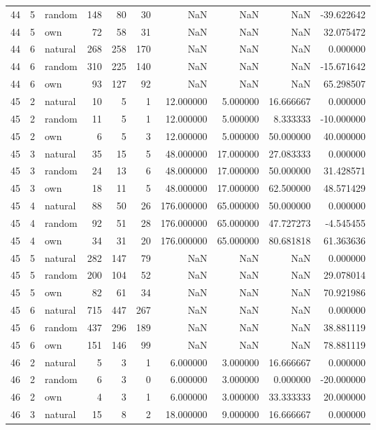\begin{table}[htbp]
\begin{tabular}{rrlrrrrrrr}
44 & 5 & random & 148 & 80 & 30 & NaN & NaN & NaN & -39.622642 \\
44 & 5 & own & 72 & 58 & 31 & NaN & NaN & NaN & 32.075472 \\
44 & 6 & natural & 268 & 258 & 170 & NaN & NaN & NaN & 0.000000 \\
44 & 6 & random & 310 & 225 & 140 & NaN & NaN & NaN & -15.671642 \\
44 & 6 & own & 93 & 127 & 92 & NaN & NaN & NaN & 65.298507 \\
45 & 2 & natural & 10 & 5 & 1 & 12.000000 & 5.000000 & 16.666667 & 0.000000 \\
45 & 2 & random & 11 & 5 & 1 & 12.000000 & 5.000000 & 8.333333 & -10.000000 \\
45 & 2 & own & 6 & 5 & 3 & 12.000000 & 5.000000 & 50.000000 & 40.000000 \\
45 & 3 & natural & 35 & 15 & 5 & 48.000000 & 17.000000 & 27.083333 & 0.000000 \\
45 & 3 & random & 24 & 13 & 6 & 48.000000 & 17.000000 & 50.000000 & 31.428571 \\
45 & 3 & own & 18 & 11 & 5 & 48.000000 & 17.000000 & 62.500000 & 48.571429 \\
45 & 4 & natural & 88 & 50 & 26 & 176.000000 & 65.000000 & 50.000000 & 0.000000 \\
45 & 4 & random & 92 & 51 & 28 & 176.000000 & 65.000000 & 47.727273 & -4.545455 \\
45 & 4 & own & 34 & 31 & 20 & 176.000000 & 65.000000 & 80.681818 & 61.363636 \\
45 & 5 & natural & 282 & 147 & 79 & NaN & NaN & NaN & 0.000000 \\
45 & 5 & random & 200 & 104 & 52 & NaN & NaN & NaN & 29.078014 \\
45 & 5 & own & 82 & 61 & 34 & NaN & NaN & NaN & 70.921986 \\
45 & 6 & natural & 715 & 447 & 267 & NaN & NaN & NaN & 0.000000 \\
45 & 6 & random & 437 & 296 & 189 & NaN & NaN & NaN & 38.881119 \\
45 & 6 & own & 151 & 146 & 99 & NaN & NaN & NaN & 78.881119 \\
46 & 2 & natural & 5 & 3 & 1 & 6.000000 & 3.000000 & 16.666667 & 0.000000 \\
46 & 2 & random & 6 & 3 & 0 & 6.000000 & 3.000000 & 0.000000 & -20.000000 \\
46 & 2 & own & 4 & 3 & 1 & 6.000000 & 3.000000 & 33.333333 & 20.000000 \\
46 & 3 & natural & 15 & 8 & 2 & 18.000000 & 9.000000 & 16.666667 & 0.000000 \\

\end{tabular}
\end{table}
